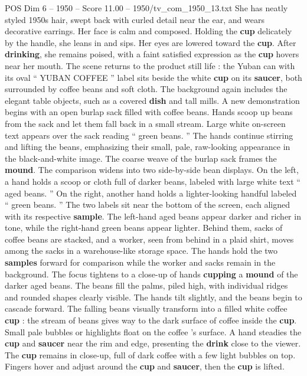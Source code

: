 \begin{textsample}{POS Dim 6 – 1950 – Score 11.00 – 1950/tv\_com\_1950\_13.txt}
She has neatly styled 1950s hair, swept back with curled detail near the ear, and wears decorative earrings.
Her face is calm and composed.
Holding the \textbf{cup} delicately by the handle, she leans in and sips.
Her eyes are lowered toward the \textbf{cup}.
After \textbf{drinking}, she remains poised, with a faint satisfied expression as the \textbf{cup} hovers near her mouth.
The scene returns to the product still life : the Yuban can with its oval “ YUBAN COFFEE ” label sits beside the white \textbf{cup} on its \textbf{saucer}, both surrounded by coffee beans and soft cloth.
The background again includes the elegant table objects, such as a covered \textbf{dish} and tall mills.
A new demonstration begins with an open burlap sack filled with coffee beans.
Hands scoop up beans from the sack and let them fall back in a small stream.
Large white on-screen text appears over the sack reading “ green beans. ” The hands continue stirring and lifting the beans, emphasizing their small, pale, raw-looking appearance in the black-and-white image.
The coarse weave of the burlap sack frames the \textbf{mound}.
The comparison widens into two side-by-side bean displays.
On the left, a hand holds a scoop or cloth full of darker beans, labeled with large white text “ aged beans. ” On the right, another hand holds a lighter-looking handful labeled “ green beans. ” The two labels sit near the bottom of the screen, each aligned with its respective \textbf{sample}.
The left-hand aged beans appear darker and richer in tone, while the right-hand green beans appear lighter.
Behind them, sacks of coffee beans are stacked, and a worker, seen from behind in a plaid shirt, moves among the sacks in a warehouse-like storage space.
The hands hold the two \textbf{samples} forward for comparison while the worker and sacks remain in the background.
The focus tightens to a close-up of hands \textbf{cupping} a \textbf{mound} of the darker aged beans.
The beans fill the palms, piled high, with individual ridges and rounded shapes clearly visible.
The hands tilt slightly, and the beans begin to cascade forward.
The falling beans visually transform into a filled white coffee \textbf{cup} : the stream of beans gives way to the dark surface of coffee inside the \textbf{cup}.
Small pale bubbles or highlights float on the coffee ’s surface.
A hand steadies the \textbf{cup} and \textbf{saucer} near the rim and edge, presenting the \textbf{drink} close to the viewer.
The \textbf{cup} remains in close-up, full of dark coffee with a few light bubbles on top.
Fingers hover and adjust around the \textbf{cup} and \textbf{saucer}, then the \textbf{cup} is lifted.

\end{textsample}
